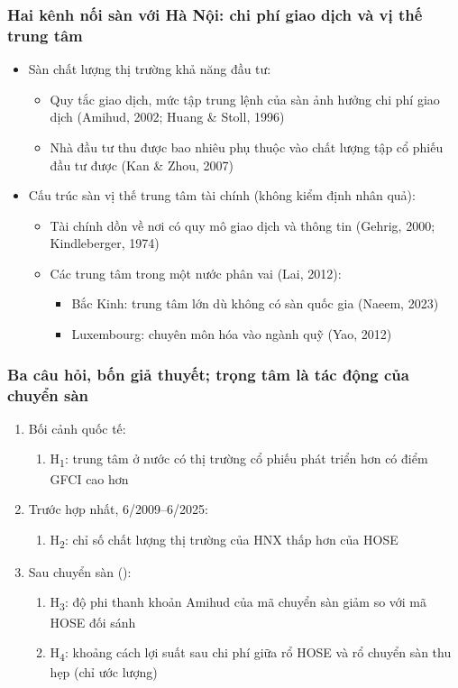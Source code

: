 \documentclass[11pt, xcolor={dvipsnames}, aspectratio=169, usepdftitle=false]{beamer}
\newcommand{\HH}[1]{H\textsubscript{#1}}
\begin{document}
\begin{frame}
\frametitle{Hai kênh nối sàn với Hà Nội: chi phí giao dịch và vị thế trung tâm}
\begin{itemize}
\item Sàn \then chất lượng thị trường \then khả năng đầu tư:
\begin{itemize}
\item Quy tắc giao dịch, mức tập trung lệnh của sàn ảnh hưởng chi phí giao dịch (Amihud, 2002; Huang \& Stoll, 1996)
\item Nhà đầu tư thu được bao nhiêu phụ thuộc vào chất lượng tập cổ phiếu đầu tư được (Kan \& Zhou, 2007)
\end{itemize}
\item Cấu trúc sàn \then vị thế trung tâm tài chính (không kiểm định nhân quả):
\begin{itemize}
\item Tài chính dồn về nơi có quy mô giao dịch và thông tin (Gehrig, 2000; Kindleberger, 1974)
\item Các trung tâm trong một nước phân vai (Lai, 2012):
\begin{itemize}
\item Bắc Kinh: trung tâm lớn dù  không có sàn quốc gia (Naeem, 2023)
\item Luxembourg: chuyên môn hóa vào ngành quỹ (Yao, 2012)
\end{itemize}
\end{itemize}
\end{itemize}
\end{frame}

\begin{frame}[label=giaThuyet]
\frametitle{Ba câu hỏi, bốn giả thuyết; trọng tâm là tác động của chuyển sàn}
\begin{enumerate}
\item Bối cảnh quốc tế:
\begin{enumerate}
\item \HH{1}: trung tâm ở nước có thị trường cổ phiếu phát triển hơn có điểm GFCI cao hơn
\end{enumerate}
\item Trước hợp nhất, 6/2009--6/2025:
\begin{enumerate}
\item \HH{2}: chỉ số chất lượng thị trường của HNX thấp hơn của HOSE
\end{enumerate}
\item Sau chuyển sàn ():
\begin{enumerate}
\item \HH{3}: độ phi thanh khoản Amihud của mã chuyển sàn giảm so với mã HOSE đối sánh
\item \HH{4}: khoảng cách lợi suất sau chi phí giữa rổ HOSE và rổ chuyển sàn thu hẹp (chỉ ước lượng)
\end{enumerate}
\end{enumerate}
\end{frame}
\end{document}
